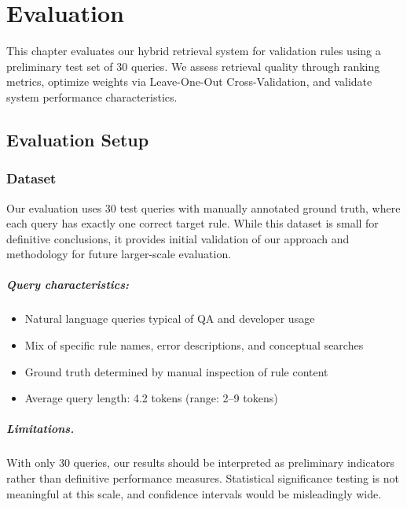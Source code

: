 \chapter{Evaluation}
\label{chap:evaluation}

This chapter evaluates our hybrid retrieval system for validation rules using a preliminary test set of 30 queries. We assess retrieval quality through ranking metrics, optimize weights via Leave-One-Out Cross-Validation, and validate system performance characteristics.

\section{Evaluation Setup}
\label{sec:evaluation-setup}

\subsection{Dataset}

Our evaluation uses 30 test queries with manually annotated ground truth, where each query has exactly one correct target rule. While this dataset is small for definitive conclusions, it provides initial validation of our approach and methodology for future larger-scale evaluation.

\paragraph{Query characteristics:}
\begin{itemize}[leftmargin=*,itemsep=2pt,topsep=2pt]
  \item Natural language queries typical of QA and developer usage
  \item Mix of specific rule names, error descriptions, and conceptual searches
  \item Ground truth determined by manual inspection of rule content
  \item Average query length: 4.2 tokens (range: 2–9 tokens)
\end{itemize}

\paragraph{Limitations.}With only 30 queries, our results should be interpreted as preliminary indicators rather than definitive performance measures. Statistical significance testing is not meaningful at this scale, and confidence intervals would be misleadingly wide.

